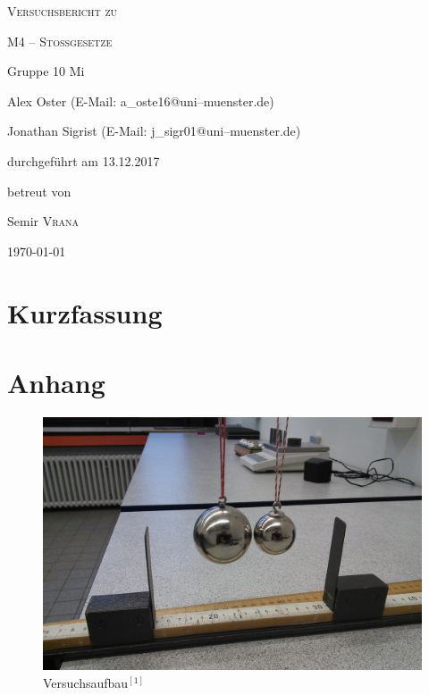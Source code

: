 \documentclass[11pt,a4paper,titlepage, ngerman]{article}
\begin{document}
	\begin{titlepage}
		\centering
		{\scshape\LARGE Versuchsbericht zu \par}
		\vspace{1cm}
		{\scshape\huge M4 -- Stoßgesetze\par}
		\vspace{2.5cm}
		{\LARGE Gruppe 10 Mi\par}
		\vspace{0.5cm}
		{\large Alex Oster (E-Mail: a\_oste16@uni--muenster.de) \par}
		{\large Jonathan Sigrist (E-Mail: j\_sigr01@uni--muenster.de) \par}
		\vfill
		durchgeführt am 13.12.2017\par
		betreut von\par
		{\large Semir \textsc{Vrana}} 
		\vfill	
		{\large \today\par}
	\end{titlepage}
	
	\tableofcontents
	
	\newpage
	
	\section{Kurzfassung}
	

	\vspace{2cm}	
	
	\newpage
	
	
	\newpage
	
	\section{Anhang}
	
	
	\begin{figure}[ht]
		\centering
		\includegraphics[width=\textwidth]{M4_1.jpg}
		\caption{Versuchsaufbau$^{[1]}$}
		\label{abb:VersuchsaufbauStoss}	
	\end{figure}
	
\end{document}
